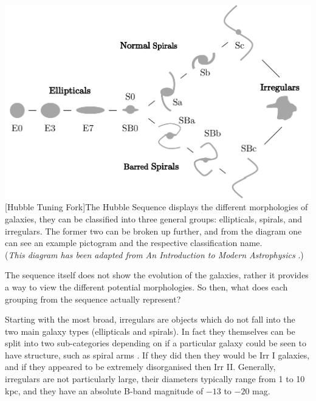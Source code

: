 \documentclass[12pt, twocolumn]{revtex4}    %
\begin{document}
\begin{center}
\includegraphics[width=1.0\linewidth]{introduction/hubble_tuning_fork}
[Hubble Tuning Fork]{The Hubble Sequence displays the different morphologies of galaxies, they can be classified into three general groups: ellipticals, spirals, and irregulars. The former two can be broken up further, and from the diagram one can see an example pictogram and the respective classification name. \\ (\textit{This diagram has been adapted from An Introduction to Modern Astrophysics} \citep{carroll_astro}.)}
\label{fig:hubble_tuning_fork}
\end{center}

The sequence itself does not show the evolution of the galaxies, rather it provides a way to view the different potential morphologies. So then, what does each grouping from the sequence actually represent? 

Starting with the most broad, irregulars are objects which do not fall into the two main galaxy types (ellipticals and spirals). In fact they themselves can be split into two sub-categories depending on if a particular galaxy could be seen to have structure, such as spiral arms \citep{carroll_astro}. If they did then they would be Irr I galaxies, and if they appeared to be extremely disorganised then Irr II. Generally, irregulars are not particularly large, their diameters typically range from 1 to 10 kpc, and they have an absolute B-band magnitude of $-13$ to $-20$ mag.

\end{document}
